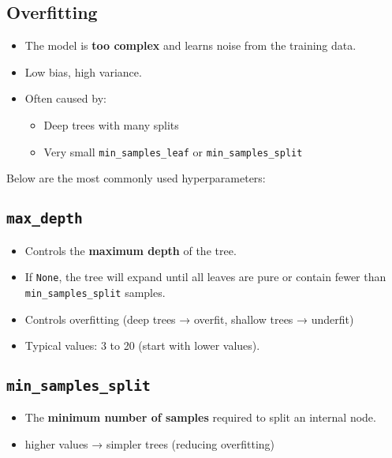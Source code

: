 \documentclass[
  letterpaper,
  DIV=11,
  numbers=noendperiod]{scrreprt}
\providecommand{\tightlist}{%
  \setlength{\itemsep}{0pt}\setlength{\parskip}{0pt}}\usepackage{longtable,booktabs,array}
\begin{document}
\subsection{Overfitting}\label{overfitting}

\begin{itemize}
\tightlist
\item
  The model is \textbf{too complex} and learns noise from the training
  data.
\item
  Low bias, high variance.
\item
  Often caused by:

  \begin{itemize}
  \tightlist
  \item
    Deep trees with many splits
  \item
    Very small \texttt{min\_samples\_leaf} or
    \texttt{min\_samples\_split}
  \end{itemize}
\end{itemize}

Below are the most commonly used hyperparameters:

\subsection{\texorpdfstring{\texttt{max\_depth}}{max\_depth}}\label{max_depth}

\begin{itemize}
\tightlist
\item
  Controls the \textbf{maximum depth} of the tree.
\item
  If \texttt{None}, the tree will expand until all leaves are pure or
  contain fewer than \texttt{min\_samples\_split} samples.
\item
  Controls overfitting (deep trees → overfit, shallow trees → underfit)
\item
  Typical values: 3 to 20 (start with lower values).
\end{itemize}

\subsection{\texorpdfstring{\texttt{min\_samples\_split}}{min\_samples\_split}}\label{min_samples_split}

\begin{itemize}
\tightlist
\item
  The \textbf{minimum number of samples} required to split an internal
  node.
\item
  higher values → simpler trees (reducing overfitting)
\end{itemize}
\end{document}
